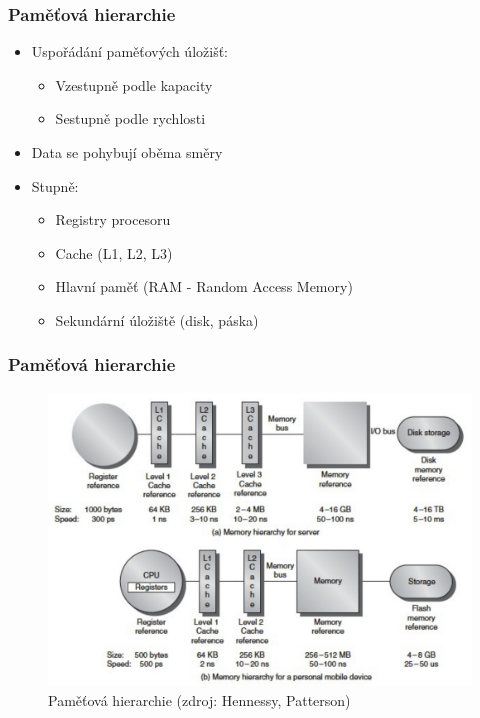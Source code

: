 \documentclass[professionalfonts,svgnames]{beamer}
\begin{document}
\begin{frame}
\frametitle{Paměťová hierarchie}
\begin{itemize}
\item Uspořádání paměťových úložišť:
	\begin{itemize}
		\item Vzestupně podle kapacity
		\item Sestupně podle rychlosti
	\end{itemize}
\item Data se pohybují oběma směry
\item Stupně:
	\begin{itemize}
	\item Registry procesoru
	\item Cache (L1, L2, L3)
	\item Hlavní paměť (RAM - Random Access Memory)
	\item Sekundární úložiště (disk, páska)
	\end{itemize}
\end{itemize}
\end{frame}

\begin{frame}
\frametitle{Paměťová hierarchie}
\begin{figure}[h]
	\includegraphics[width=\textwidth,keepaspectratio]{fig/hier}
	\caption{Paměťová hierarchie (zdroj: Hennessy, Patterson)}
	\label{hier}
\end{figure}
\end{frame}
\end{document}
